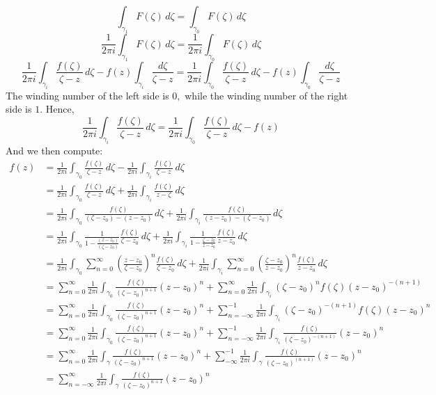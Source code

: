 \documentclass[10pt, oneside]{article}
\theoremstyle{definition}
\begin{document}
\[\int_{\gamma_1}F(\zeta)\,d\zeta = \int_{\gamma_0}F(\zeta)\,d\zeta\]
\[\frac{1}{2\pi i}\int_{\gamma_1}F(\zeta)\,d\zeta =\frac{1}{2\pi i} \int_{\gamma_0}F(\zeta)\,d\zeta\]
\[ \frac{1}{2\pi i}\int_{\gamma_i}\frac{f(\zeta)}{\zeta - z}\,d\zeta - f(z) \int_{\gamma_i} \frac{d\zeta}{\zeta - z} = \frac{1}{2\pi i}\int_{\gamma_0}\frac{f(\zeta)}{\zeta - z}\,d\zeta - f(z) \int_{\gamma_0} \frac{d\zeta}{\zeta - z}\]
The winding number of the left side is $0,$ while the winding number of the right side is $1.$ Hence, 
\[\frac{1}{2\pi i}\int_{\gamma_i}\frac{f(\zeta)}{\zeta - z}\,d\zeta  = \frac{1}{2\pi i}\int_{\gamma_0}\frac{f(\zeta)}{\zeta - z}\,d\zeta - f(z)\]
And we then compute:
\begin{align*}
    f(z) &= \frac{1}{2\pi i}\int_{\gamma_0}\frac{f(\zeta)}{\zeta - z}\,d\zeta  - \frac{1}{2\pi i}\int_{\gamma_i}\frac{f(\zeta)}{\zeta - z}\,d\zeta\\
    &= \frac{1}{2\pi i}\int_{\gamma_0}\frac{f(\zeta)}{\zeta - z}\,d\zeta  + \frac{1}{2\pi i}\int_{\gamma_i}\frac{f(\zeta)}{z - \zeta}\,d\zeta\\
    &= \frac{1}{2\pi i}\int_{\gamma_0}\frac{f(\zeta)}{(\zeta - z_0) - (z - z_0)}\,d\zeta  + \frac{1}{2\pi i}\int_{\gamma_i}\frac{f(\zeta)}{(z -z_0) - (\zeta -  z_0)}\,d\zeta\\
    &= \frac{1}{2\pi i}\int_{\gamma_0}\frac{1}{1 - \frac{(z - z_0)}{(\zeta - z_0)}} \frac{f(\zeta)}{\zeta - z_0}\,d\zeta  + \frac{1}{2\pi i}\int_{\gamma_i}\frac{1}{1 - \frac{\zeta - z_0}{z - z_0}} \frac{f(\zeta)}{z - z_0}\,d\zeta\\
    &=  \frac{1}{2\pi i}\int_{\gamma_0}\sum_{n=0}^\infty \left(\frac{z - z_0}{\zeta - z_0}\right)^n \frac{f(\zeta)}{\zeta - z_0}\,d\zeta  + \frac{1}{2\pi i}\int_{\gamma_i}\sum_{n=0}^\infty \left(\frac{\zeta - z_0}{z - z_0}\right)^n\frac{f(\zeta)}{z - z_0}\,d\zeta\\
    &= \sum_{n=0}^\infty \frac{1}{2\pi i}\int_{\gamma_0} \frac{f(\zeta)}{(\zeta - z_0)^{n+1}} (z - z_0)^n + \sum_{n=0}^\infty \frac{1}{2\pi i}\int_{\gamma_i} (\zeta - z_0)^n f(\zeta)(z - z_0)^{-(n+1)}\\
    &= \sum_{n=0}^\infty \frac{1}{2\pi i}\int_{\gamma_0} \frac{f(\zeta)}{(\zeta - z_0)^{n+1}} (z - z_0)^n + \sum_{n=-\infty}^{-1} \frac{1}{2\pi i}\int_{\gamma_i} (\zeta - z_0)^{-(n+1)}f(\zeta)(z - z_0)^{n}\\
    &= \sum_{n=0}^\infty \frac{1}{2\pi i}\int_{\gamma_0} \frac{f(\zeta)}{(\zeta - z_0)^{n+1}} (z - z_0)^n + \sum_{n=-\infty}^{-1} \frac{1}{2\pi i}\int_{\gamma_i} \frac{f(\zeta)}{(\zeta - z_0)^{-(n+1)}}(z - z_0)^{n}\\
    &= \sum_{n=0}^\infty \frac{1}{2\pi i}\int_{\gamma} \frac{f(\zeta)}{(\zeta - z_0)^{n+1}} (z - z_0)^n + \sum_{-\infty}^{-1} \frac{1}{2\pi i}\int_{\gamma} \frac{f(\zeta)}{(\zeta - z_0)^{(n+1)}}(z - z_0)^{n}\\
    &= \sum_{n=-\infty}^{\infty} \frac{1}{2\pi i}\int_{\gamma} \frac{f(\zeta)}{(\zeta - z_0)^{n+1}}(z - z_0)^{n}
\end{align*}
\end{document}
